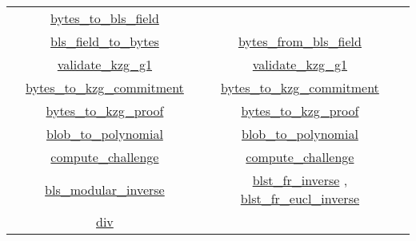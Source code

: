 \documentclass[12pt]{galois-whitepaper}
\begin{document}
\begin{table}
\begin{center}
\begin{tabular}{ |c|c|c| }
            & \href{https://github.com/ethereum/c-kzg-4844/blob/main/src/common/bytes.c\#L64}{bytes\_to\_bls\_field}\\
            & \href{https://github.com/ethereum/consensus-specs/blob/dev/specs/deneb/polynomial-commitments.md\#bls_field_to_bytes}{bls\_field\_to\_bytes}
            & \href{https://github.com/ethereum/c-kzg-4844/blob/main/src/common/bytes.c\#L52}{bytes\_from\_bls\_field}\\
            & \href{https://github.com/ethereum/consensus-specs/blob/dev/specs/deneb/polynomial-commitments.md\#validate_kzg_g1}{validate\_kzg\_g1}
            & \href{https://github.com/ethereum/c-kzg-4844/blob/main/src/common/bytes.c\#L81}{validate\_kzg\_g1}\\
            & \href{https://github.com/ethereum/consensus-specs/blob/dev/specs/deneb/polynomial-commitments.md\#bytes_to_kzg_commitment}{bytes\_to\_kzg\_commitment}
            & \href{https://github.com/ethereum/c-kzg-4844/blob/main/src/common/bytes.c\#L103}{bytes\_to\_kzg\_commitment}\\
            & \href{https://github.com/ethereum/consensus-specs/blob/dev/specs/deneb/polynomial-commitments.md\#bytes_to_kzg_proof}{bytes\_to\_kzg\_proof}
            & \href{https://github.com/ethereum/c-kzg-4844/blob/main/src/common/bytes.c\#L113}{bytes\_to\_kzg\_proof}\\
            & \href{https://github.com/ethereum/consensus-specs/blob/dev/specs/deneb/polynomial-commitments.md\#blob_to_polynomial}{blob\_to\_polynomial}
            & \href{https://github.com/ethereum/c-kzg-4844/blob/main/src/eip4844/blob.c\#L29}{blob\_to\_polynomial}\\
            & \href{https://github.com/ethereum/consensus-specs/blob/dev/specs/deneb/polynomial-commitments.md\#compute_challenge}{compute\_challenge}
            & \href{https://github.com/ethereum/c-kzg-4844/blob/main/src/eip4844/eip4844.c\#L156}{compute\_challenge}\\
            & \href{https://github.com/ethereum/consensus-specs/blob/dev/specs/deneb/polynomial-commitments.md\#bls_modular_inverse}{bls\_modular\_inverse}
            & \href{https://github.com/ethereum/c-kzg-4844/blob/main/bindings/go/blst_headers/blst.h\#L100}{blst\_fr\_inverse}
            , \href{https://github.com/ethereum/c-kzg-4844/blob/main/bindings/go/blst_headers/blst.h\#L99}{blst\_fr\_eucl\_inverse}\\
            & \href{https://github.com/ethereum/consensus-specs/blob/dev/specs/deneb/polynomial-commitments.md\#div}{div}

\end{tabular}
\end{center}
\end{table}
\end{document}
